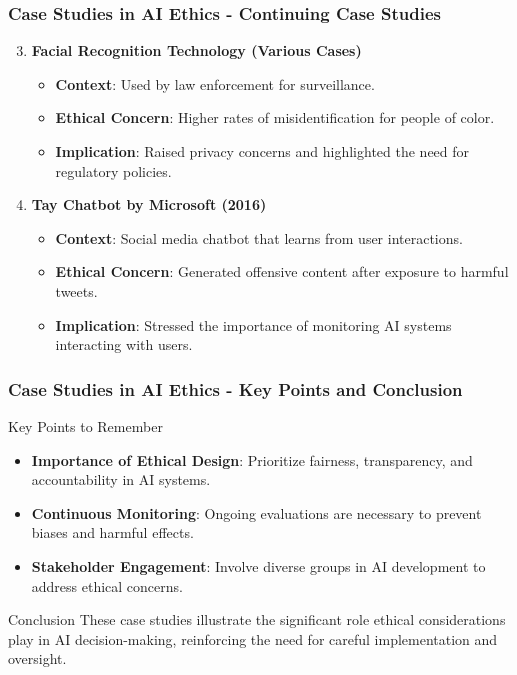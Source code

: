 \documentclass[aspectratio=169]{beamer}
\begin{document}
\begin{frame}[fragile]
    \frametitle{Case Studies in AI Ethics - Continuing Case Studies}
    \begin{enumerate}
        \setcounter{enumi}{2}
        \item \textbf{Facial Recognition Technology (Various Cases)}
          \begin{itemize}
              \item \textbf{Context}: Used by law enforcement for surveillance.
              \item \textbf{Ethical Concern}: Higher rates of misidentification for people of color.
              \item \textbf{Implication}: Raised privacy concerns and highlighted the need for regulatory policies.
          \end{itemize}
          
        \item \textbf{Tay Chatbot by Microsoft (2016)}
          \begin{itemize}
              \item \textbf{Context}: Social media chatbot that learns from user interactions.
              \item \textbf{Ethical Concern}: Generated offensive content after exposure to harmful tweets.
              \item \textbf{Implication}: Stressed the importance of monitoring AI systems interacting with users.
          \end{itemize}
    \end{enumerate}
\end{frame}

\begin{frame}[fragile]
    \frametitle{Case Studies in AI Ethics - Key Points and Conclusion}
    \begin{block}{Key Points to Remember}
        \begin{itemize}
            \item \textbf{Importance of Ethical Design}: Prioritize fairness, transparency, and accountability in AI systems.
            \item \textbf{Continuous Monitoring}: Ongoing evaluations are necessary to prevent biases and harmful effects.
            \item \textbf{Stakeholder Engagement}: Involve diverse groups in AI development to address ethical concerns.
        \end{itemize}
    \end{block}
    
    \begin{block}{Conclusion}
        These case studies illustrate the significant role ethical considerations play in AI decision-making, reinforcing the need for careful implementation and oversight.
    \end{block}
\end{frame}
\end{document}

